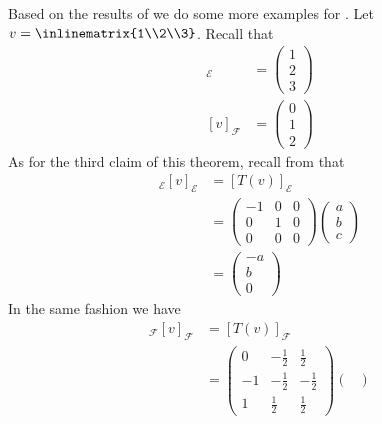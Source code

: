 \begin{exm}
	Based on the results of  we do some
	more examples for .
	Let $v=\inlinematrix{1\\2\\3}$. Recall that
	\begin{align*}
		[v]_\mathcal{E} & =\begin{pmatrix}
			1 \\2\\3
		\end{pmatrix} \\
		[v]_\mathcal{F} & =\begin{pmatrix}
			0 \\1\\2
		\end{pmatrix}
	\end{align*}
	As for the third claim of this theorem, recall from  that
	\begin{align*}
		[T]_\mathcal{E}[v]_\mathcal{E} & =[T(v)]_\mathcal{E}                                   \\
		                               & =\begin{pmatrix}
			-1 & 0 & 0 \\
			0  & 1 & 0 \\
			0  & 0 & 0
		\end{pmatrix}\begin{pmatrix}
			a \\b\\c
		\end{pmatrix} \\
		                               & =\begin{pmatrix}
			-a \\b\\0
		\end{pmatrix}
	\end{align*}
	In the same fashion we have
	\begin{align*}
		[T]_\mathcal{F}[v]_\mathcal{F} & =[T(v)]_\mathcal{F}                                   \\
		                               & =\begin{pmatrix}
			0  & -\frac{1}{2} & \frac{1}{2}  \\[4pt]
			-1 & -\frac{1}{2} & -\frac{1}{2} \\[4pt]
			1  & \frac{1}{2}  & \frac{1}{2}
		\end{pmatrix}\begin{pmatrix}

\end{pmatrix}
\end{align*}
\end{exm}
